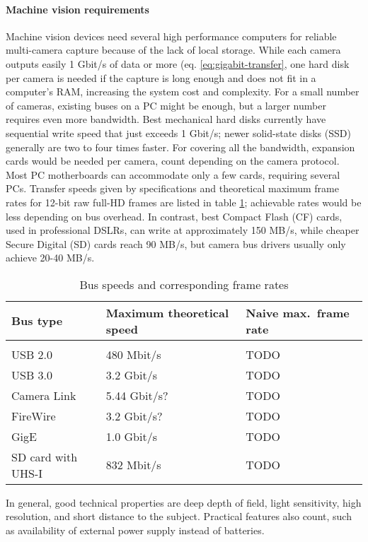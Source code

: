 \paragraph{Machine vision requirements}
Machine vision devices need several high performance computers for reliable multi-camera capture because of the lack of local storage.
While each camera outputs easily 1 Gbit/s of data or more (eq. \ref{eq:gigabit-transfer}, one hard disk per camera is needed if the capture is long enough and does not fit in a computer's RAM, increasing the system cost and complexity.
For a small number of cameras, existing buses on a PC might be enough, but a larger number requires even more bandwidth.
Best mechanical hard disks currently have sequential write speed that just exceeds 1 Gbit/s;
newer solid-state disks (SSD) generally are two to four times faster.
For covering all the bandwidth, expansion cards would be needed per camera, count depending on the camera protocol.
Most PC motherboards can accommodate only a few cards, requiring several PCs.
Transfer speeds given by specifications and theoretical maximum frame rates for 12-bit raw full-HD frames are listed in table \ref{tab:busspeeds}; achievable rates would be less depending on bus overhead.
In contrast, best Compact Flash (CF) cards, used in professional DSLRs, can write at approximately 150 MB/s, while cheaper Secure Digital (SD) cards reach 90 MB/s, but camera bus drivers usually only achieve 20-40 MB/s. %

\begin{table}[h]
	\centering
	\begin{tabular}{l l l}
		Bus type & Maximum theoretical speed & Naive max.\ frame rate\\
		\hline \\
		USB 2.0 & 480 Mbit/s & TODO\\
		USB 3.0 & 3.2 Gbit/s & TODO\\
		Camera Link & 5.44 Gbit/s? & TODO\\
		FireWire & 3.2 Gbit/s? & TODO\\
		GigE & 1.0 Gbit/s & TODO\\
		SD card with UHS-I & 832 Mbit/s & TODO\\
	\end{tabular}
	\caption{Bus speeds and corresponding frame rates}
	\label{tab:busspeeds}
\end{table}

In general, good technical properties are deep depth of field, light sensitivity, high resolution, and short distance to the subject.
Practical features also count, such as availability of external power supply instead of batteries.

